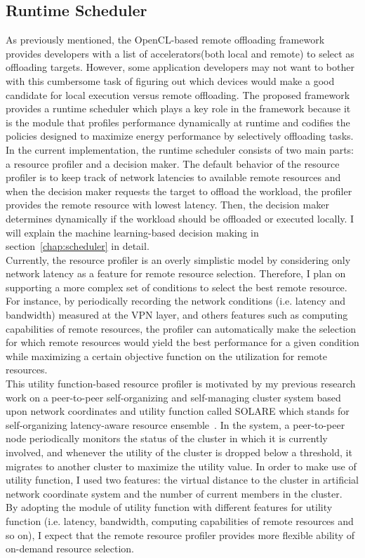 \subsection{Runtime Scheduler}
\label{offloading:scheduler}
%
As previously mentioned, the OpenCL-based remote offloading framework
provides developers with a list of accelerators(both local and remote)
to select as offloading targets.
%
However, some application developers may not want to bother with this
cumbersome task of figuring out which devices would make a good
candidate for local execution versus remote offloading.
%
The proposed framework provides a runtime scheduler which plays a key
role in the framework because it is the module that profiles performance
dynamically at runtime and codifies the policies designed to maximize
energy performance by selectively offloading tasks.\\ 
%
In the current implementation, the runtime scheduler consists of two
main parts: a resource profiler and a decision maker.
%
The default behavior of the resource profiler is to keep track of
network latencies to available remote resources and when the decision
maker requests the target to offload the workload, the profiler
provides the remote resource with lowest latency.
%
Then, the decision maker determines dynamically if the workload should
be offloaded or executed locally.
%
I  will explain the machine learning-based decision making in
section~\ref{chap:scheduler} in detail.\\
%
Currently, the resource profiler is an overly simplistic model by
considering only network latency as a feature for remote resource
selection.
%
Therefore, I plan on supporting a more complex set of conditions to
select the best remote resource.
%
For instance, by periodically recording the network
conditions (i.e. latency and bandwidth) measured at the VPN layer, and
others features such as computing capabilities of remote resources, the
profiler can automatically make the selection for which remote resources
would yield the best performance for a given condition while maximizing
a certain objective function on the utilization for remote resources.\\
%
This utility function-based resource profiler is motivated by my
previous research work on a peer-to-peer self-organizing and
self-managing cluster system based upon network coordinates and utility
function called SOLARE which stands for self-organizing latency-aware
resource ensemble~\cite{solare}. 
%
In the system, a peer-to-peer node periodically monitors the status of
the cluster in which it is currently involved, and whenever the utility
of the cluster is dropped below a threshold, it migrates to another
cluster to maximize the utility value.
%
In order to make use of utility function, I used two features: the
virtual distance to the cluster in artificial network coordinate system
and the number of current members in the cluster.\\
%
By adopting the module of utility function with different features for
utility function (i.e. latency, bandwidth, computing capabilities of
remote resources and so on), I expect that the remote resource profiler
provides more flexible ability of on-demand resource selection. 
%

